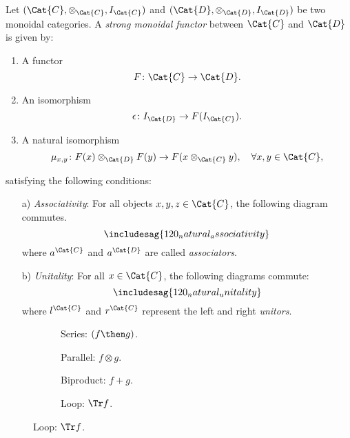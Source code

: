 \begin{ctdefinition}
Let $(\Cat{C},\otimes_\Cat{C},I_\Cat{C})$ and $(\Cat{D},\otimes_\Cat{D},I_\Cat{D})$ be two monoidal categories. A \emph{strong monoidal functor} between $\Cat{C}$ and $\Cat{D}$ is given by:
\begin{enumerate}
    \item A functor 
    \begin{equation}
        F\colon \Cat{C}\to \Cat{D}.
    \end{equation}
    \item An isomorphism 
    \begin{equation}
        \epsilon\colon I_\Cat{D}\to F(I_\Cat{C}).
    \end{equation}
    \item A natural isomorphism
    \begin{equation}
        \mu_{x,y}\colon F(x)\otimes_\Cat{D} F(y) \to F(x\otimes_\Cat{C} y),\quad \forall x,y\in \Cat{C},
    \end{equation}
\end{enumerate}
satisfying the following conditions:
\begin{enumerate}
    \item[a)] \emph{Associativity}: For all objects $x,y,z\in \Cat{C}$, the following diagram commutes.
    \begin{equation}
        \includesag{120_natural_associativity}
    \end{equation}
    where $a^\Cat{C}$ and $a^\Cat{D}$ are called \emph{associators}.
    \item[b)] \emph{Unitality}: For all $x\in \Cat{C}$, the following diagrams commute:
    \begin{equation}
        \includesag{120_natural_unitality}
    \end{equation}
    where $l^\Cat{C}$ and $r^\Cat{C}$ represent the left and right \emph{unitors}.
\end{enumerate}
\end{ctdefinition} 


\begin{figure}[h!]
\centering
\begin{subfigure}{0.2\textwidth}
\centering
{}
\caption{Series: $(f \then g)$.}
\end{subfigure}
\hspace{10mm} %
\begin{subfigure}{0.2\textwidth}
\centering
{}
\caption{Parallel: $f \otimes g$.}
\end{subfigure}
\hspace{10mm} %
\begin{subfigure}{0.2\textwidth}
\centering
{}
\caption{Biproduct: $f + g$.}
\end{subfigure}
\hspace{10mm} %
\begin{subfigure}{0.2\textwidth}
\centering
{}
\caption{Loop: $\Tr f$.}
\end{subfigure}
\label{fig:diagrams}
\end{figure}

